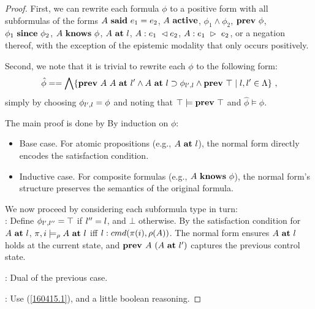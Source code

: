 \begin{proof}
First, we can rewrite each formula $\phi$ to a positive form with all subformulas of the forms
$A\ \mathbf{said}\ e_1 = e_2$, $A\ \mathbf{active}$, $\phi_1\wedge \phi_2$, $\mathbf{prev}\ \phi$, $\phi_1\ \mathbf{since}\ \phi_2$,
$A\ \mathbf{knows}\ \phi$, $A\ \mathbf{at}\ l$, $A:e_1\ \lhd e_2$, $A:e_1\ \rhd\ e_2$, or a negation thereof, with the exception of
the epistemic modality that only occurs positively.

Second, we note that it is trivial to rewrite each $\phi$ to the following form:
\begin{equation}
\label{160415.1}
\hat{\phi} == \bigwedge\{\mathbf{prev}\ A\ A\ \mathbf{at}\ l' \wedge A\ \mathbf{at}\ l \supset \phi_{l',l} \wedge \mathbf{prev}\ \top \mid l,l'\in\Lambda\}\ ,
\end{equation}
simply by choosing $\phi_{l',l} = \phi$ and noting that $\top \models \mathbf{prev}\ \top$ and $\hat{\phi} \models \phi$.

The main proof is done by By induction on $\phi$:
\begin{itemize}
    \item Base case. For atomic propositions (e.g., $A\ \mathbf{at}\ l$), the normal form directly encodes the satisfaction condition.
    \item Inductive case.  For composite formulas (e.g., $A\ \mathbf{knows}\ \phi$), the normal form's structure preserves the semantics of the original formula.
\end{itemize}
We now proceed by considering each subformula type in turn:\\

\noindent{}:
Define \(\phi_{l',l''} = \top\) if \(l'' = l\), and \(\bot\) otherwise. By the satisfaction condition for \(A\ \mathbf{at}\ l\), \(\pi, i \models_\rho A\ \mathbf{at}\ l\) iff \(l : cmd(\pi(i), \rho(A))\).
The normal form ensures \(A\ \mathbf{at}\ l\) holds at the current state, and \(\textbf{prev } A \ (A\ \mathbf{at}\ l')\) captures the previous control state.

\noindent{}: Dual of the previous case.

\noindent{}: Use (\ref{160415.1}), and a little boolean reasoning.


\end{proof}

